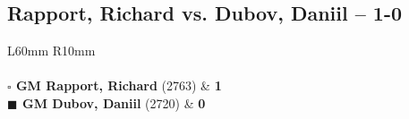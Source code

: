 \documentclass[../main.tex]{subfiles}
\begin{document}
\subsection{Rapport, Richard vs. Dubov, Daniil -- 1-0}

\begin{multicols*}{2}

\begin{tabular}{L{60mm} R{10mm}}
\\ 
\\[3mm]
\textbf{$\square$ \hspace{2mm}  GM Rapport, Richard} (2763)  & \textbf{1}\\ 
\textbf{$\blacksquare$ \hspace{2mm}  GM Dubov, Daniil} (2720)  & \textbf{0}\\ 
\end{tabular}

\end{multicols*}
\newpage
\end{document}
